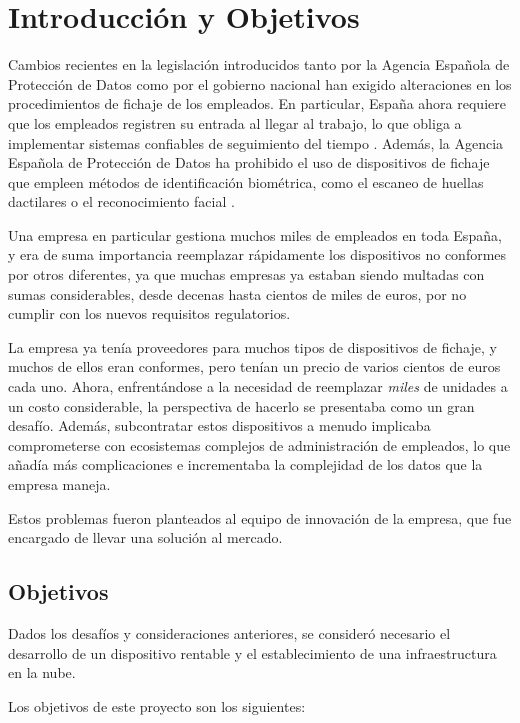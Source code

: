 \chapter{Introducción y Objetivos}
\label{cap:introduccion}

Cambios recientes en la legislación introducidos tanto por la Agencia Española de Protección de 
Datos como por el gobierno nacional han exigido alteraciones en los procedimientos de fichaje 
de los empleados. En particular, España ahora requiere que los empleados registren su entrada al 
llegar al trabajo, lo que obliga a implementar sistemas confiables de seguimiento del tiempo 
\cite{boe_obligacionfichajes}. Además, la Agencia Española de Protección de Datos ha prohibido el 
uso de dispositivos de fichaje que empleen métodos de identificación biométrica, como el escaneo 
de huellas dactilares o el reconocimiento facial \cite{aepd_prohibicionbiometricos}.

Una empresa en particular gestiona muchos miles de empleados en toda España, y era de suma 
importancia reemplazar rápidamente los dispositivos no conformes por otros diferentes, ya que 
muchas empresas ya estaban siendo multadas con sumas considerables, desde decenas hasta cientos de 
miles de euros, por no cumplir con los nuevos requisitos regulatorios.

La empresa ya tenía proveedores para muchos tipos de dispositivos de fichaje, y muchos de ellos 
eran conformes, pero tenían un precio de varios cientos de euros cada uno. Ahora, enfrentándose a 
la necesidad de reemplazar \textit{miles} de unidades a un costo considerable, la perspectiva de 
hacerlo se presentaba como un gran desafío. Además, subcontratar estos dispositivos a menudo 
implicaba comprometerse con ecosistemas complejos de administración de empleados, lo que añadía 
más complicaciones e incrementaba la complejidad de los datos que la empresa maneja.

Estos problemas fueron planteados al equipo de innovación de la empresa, que fue encargado de 
llevar una solución al mercado.

\section{Objetivos}

Dados los desafíos y consideraciones anteriores, se consideró necesario el desarrollo de un 
dispositivo rentable y el establecimiento de una infraestructura en la nube.

Los objetivos de este proyecto son los siguientes:

